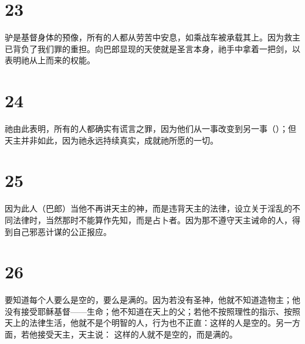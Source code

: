 
\section{23}

  驴是基督身体的预像，所有的人都从劳苦中安息，如乘战车被承载其上。因为救主已背负了我们罪的重担。向巴郎显现的天使就是圣言本身，祂手中拿着一把剑，以表明祂从上而来的权能。\par


\section{24}

  祂由此表明，所有的人都确实有谎言之罪，因为他们从一事改变到另一事（）；但天主并非如此，因为祂永远持续真实，成就祂所愿的一切。\par


\section{25}

  因为此人（巴郎）当他不再讲天主的神，而是违背天主的法律，设立关于淫乱的不同法律时，当然那时不能算作先知，而是占卜者。因为那不遵守天主诫命的人，得到自己邪恶计谋的公正报应。\par


\section{26}

要知道每个人要么是空的，要么是满的。因为若没有圣神，他就不知道造物主；他没有接受耶稣基督——生命；他不知道在天上的父；若他不按照理性的指示、按照天上的法律生活，他就不是个明智的人，行为也不正直：这样的人是空的。另一方面，若他接受天主，天主说： 这样的人就不是空的，而是满的。\par

